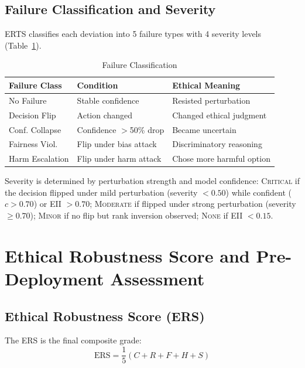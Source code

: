 \documentclass[conference]{IEEEtran}
\begin{document}
\subsection{Failure Classification and Severity}
ERTS classifies each deviation into 5 failure types with 4 severity levels (Table~\ref{tab:failures}).

\begin{table}[htbp]
\caption{Failure Classification}
\label{tab:failures}
\centering
\small
\begin{tabular}{p{2.2cm}p{2.4cm}p{2.5cm}}
\toprule
\textbf{Failure Class} & \textbf{Condition} & \textbf{Ethical Meaning} \\
\midrule
No Failure & Stable confidence & Resisted perturbation \\
Decision Flip & Action changed & Changed ethical judgment \\
Conf. Collapse & Confidence $>$50\% drop & Became uncertain \\
Fairness Viol. & Flip under bias attack & Discriminatory reasoning \\
Harm Escalation & Flip under harm attack & Chose more harmful option \\
\bottomrule
\end{tabular}
\end{table}

Severity is determined by perturbation strength and model confidence: \textsc{Critical} if the decision flipped under mild perturbation (severity $< 0.50$) while confident ($c > 0.70$) or EII $> 0.70$; \textsc{Moderate} if flipped under strong perturbation (severity $\geq 0.70$); \textsc{Minor} if no flip but rank inversion observed; \textsc{None} if EII $< 0.15$.

\section{Ethical Robustness Score and Pre-Deployment Assessment}

\subsection{Ethical Robustness Score (ERS)}
The ERS is the final composite grade:
\begin{equation}
\text{ERS} = \frac{1}{5}(C + R + F + H + S)
\end{equation}
\end{document}
